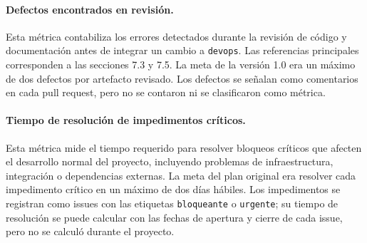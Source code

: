 \paragraph{Defectos encontrados en revisión.}
Esta métrica contabiliza los errores detectados durante la revisión de código y documentación antes de integrar un cambio a \texttt{devops}. Las referencias principales corresponden a las secciones 7.3 y 7.5. La meta de la versión 1.0 era un máximo de dos defectos por artefacto revisado. Los defectos se señalan como comentarios en cada pull request, pero no se contaron ni se clasificaron como métrica.

\paragraph{Tiempo de resolución de impedimentos críticos.}
Esta métrica mide el tiempo requerido para resolver bloqueos críticos que afecten el desarrollo normal del proyecto, incluyendo problemas de infraestructura, integración o dependencias externas. La meta del plan original era resolver cada impedimento crítico en un máximo de dos días hábiles. Los impedimentos se registran como issues con las etiquetas \texttt{bloqueante} o \texttt{urgente}; su tiempo de resolución se puede calcular con las fechas de apertura y cierre de cada issue, pero no se calculó durante el proyecto.
